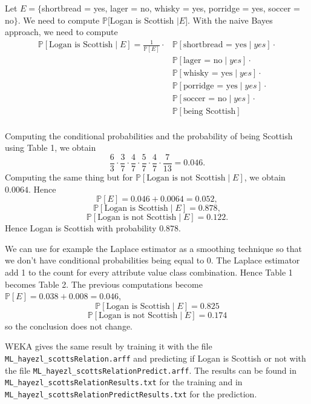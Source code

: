 \documentclass[fontsize=12pt, usenames, dvipsnames, headinclude, headsepline, footinclude, footsepline]{scrartcl}
\renewcommand{\P}{\mathbb{P}}
\begin{document}
  \begin{sol}
    Let $E = \{$shortbread = yes, lager = no, whisky = yes, porridge = yes, soccer = no$\}$. We need to
    compute $\P[$Logan is Scottish $\mid E]$. With the naive Bayes approach, we need to compute
    \begin{align*}
      \P[\text{Logan is Scottish} \mid E] = \frac{1}{\P[E]} \cdot &\P[\text{shortbread = yes} \mid yes] \cdot \\
      & \P[\text{lager = no} \mid yes] \cdot \\
      & \P[\text{whisky = yes} \mid yes] \cdot \\
      & \P[\text{porridge = yes} \mid yes] \cdot \\
      & \P[\text{soccer = no} \mid yes] \cdot \\
      & \P[\text{being Scottish}] \\
    \end{align*}

    Computing the conditional probabilities and the probability of being Scottish using Table 1, we obtain 
    \[ \frac{6}{3} \cdot \frac{3}{7} \cdot \frac{4}{7} \cdot \frac{5}{7} \cdot \frac{4}{7} \cdot \frac{7}{13}
      = 0.046. \]
    Computing the same thing but for $\P[\text{Logan is not Scottish} \mid E]$, we obtain $0.0064$. Hence 
    \[ \P[E] = 0.046 + 0.0064 = 0.052, \]
    \[ \P[\text{Logan is Scottish} \mid E] = 0.878, \]
    \[ \P[\text{Logan is not Scottish} \mid E] = 0.122. \]
    Hence Logan is Scottish with probability $0.878$.

    We can use for example the Laplace estimator as a smoothing technique so that we don't have conditional
    probabilities being equal to 0. The Laplace estimator add 1 to the count for every attribute value class
    combination. Hence Table 1 becomes Table 2. The previous computations become $\P[E] = 0.038 + 0.008 =
    0.046$, 
    \[ \P[\text{Logan is Scottish} \mid E] = 0.825 \]
    \[ \P[\text{Logan is not Scottish} \mid E] = 0.174 \]
    so the conclusion does not change. 

    WEKA gives the same result by training it with the file \texttt{ML\_hayezl\_scottsRelation.arff} and
    predicting if Logan is Scottish or not with the file \texttt{ML\_hayezl\_scottsRelationPredict.arff}. The
    results can be found in \texttt{ML\_hayezl\_scottsRelationResults.txt} for the training and in
    \texttt{ML\_hayezl\_scottsRelationPredictResults.txt} for the prediction. 
  \end{sol}
\end{document}
